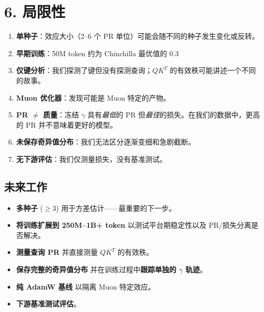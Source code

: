 \documentclass[11pt]{ctexart}
\begin{document}
\section{6. 局限性}

\begin{enumerate}
\item \textbf{单种子}：效应大小（2--6 个 PR 单位）可能会随不同的种子发生变化或反转。
\item \textbf{早期训练}：50M token 约为 Chinchilla 最优值的 0.3%
\item \textbf{仅键分析}：我们探测了键但没有探测查询；$QK^T$ 的有效秩可能讲述一个不同的故事。
\item \textbf{Muon 优化器}：发现可能是 Muon 特定的产物。
\item \textbf{PR $\neq$ 质量}：冻结 $\gamma$ 具有\textit{最低}的 PR 但\textit{最佳}的损失。在我们的数据中，更高的 PR 并不意味着更好的模型。
\item \textbf{未保存奇异值分布}：我们无法区分逐渐变细和急剧截断。
\item \textbf{无下游评估}：我们仅测量损失，没有基准测试。
\end{enumerate}

\subsection{未来工作}

\begin{itemize}
\item \textbf{多种子} ($\geq$3) 用于方差估计——最重要的下一步。
\item \textbf{将训练扩展到 250M--1B+ token} 以测试平台期稳定性以及 PR/损失分离是否解决。
\item \textbf{测量查询 PR} 并直接测量 $QK^T$ 的有效秩。
\item \textbf{保存完整的奇异值分布} 并在训练过程中\textbf{跟踪单独的 $\gamma$ 轨迹}。
\item \textbf{纯 AdamW 基线} 以隔离 Muon 特定效应。
\item \textbf{下游基准测试评估}。
\end{itemize}
\end{document}
